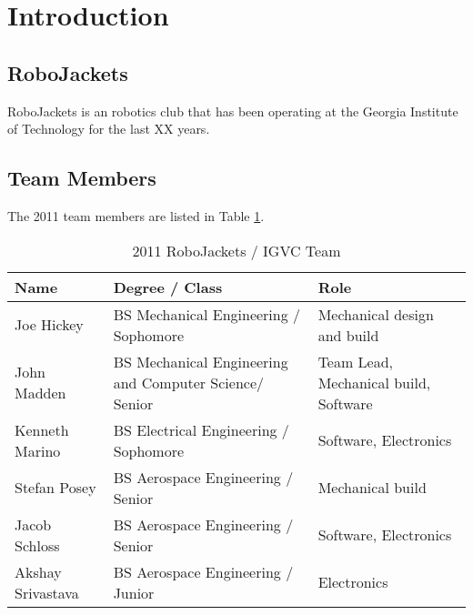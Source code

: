 \section{Introduction}

\subsection{RoboJackets}


RoboJackets is an robotics club that has been operating at the Georgia Institute of Technology for the last XX years. 

\subsection{Team Members}

The 2011 team members are listed in Table \ref{TAB:RJTeam}.

\begin{table}[H]
\begin{center}
\caption{2011 RoboJackets / IGVC Team}
\begin{tabular}{| l | p{2.4in} | p{2in} |}
\hline
Name & Degree / Class & Role\\ \hline
Joe Hickey &		BS Mechanical Engineering / Sophomore&	Mechanical design and build\\ \hline
John Madden &		BS Mechanical Engineering and Computer Science/ Senior & Team Lead, Mechanical build, Software\\ \hline
Kenneth Marino &	BS Electrical Engineering / Sophomore&	Software, Electronics\\ \hline
Stefan Posey &		BS Aerospace Engineering / Senior &		Mechanical build\\ \hline
Jacob Schloss &		BS Aerospace Engineering / Senior&	Software, Electronics\\ \hline
Akshay Srivastava &	BS Aerospace Engineering / Junior&	Electronics\\ \hline

\end{tabular}
\label{TAB:RJTeam}
\end{center}
\end{table}

